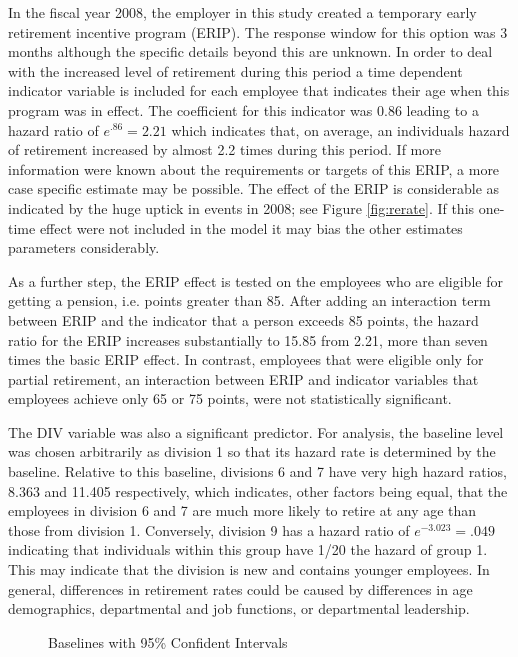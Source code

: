 In the fiscal year 2008, the employer in this study created a temporary early retirement incentive program (ERIP). The response window for this option was 3 months although the specific details beyond this are unknown. In order to deal with the increased level of retirement during this period a time dependent indicator variable is included for each employee that indicates their age when this program was in effect.  The coefficient for this indicator was 0.86 leading to a hazard ratio of $e^{.86} = 2.21$ which indicates that, on average, an individuals hazard of retirement increased by almost 2.2 times during this period.  If more information were known about the requirements or targets of this ERIP, a more case specific estimate may be possible.  The effect of the ERIP is considerable as indicated by the huge uptick in events in 2008; see Figure \ref{fig:rerate}. If this one-time effect were not included in the model it may bias the other estimates parameters considerably.

As a further step, the ERIP effect is tested on the employees who are eligible for getting a pension, i.e. points greater than 85. After adding an interaction term between ERIP and the indicator that a person exceeds 85 points, the hazard ratio for the ERIP increases substantially to 15.85 from 2.21, more than seven times the basic ERIP effect. In contrast, employees that were eligible only for partial retirement, an interaction between ERIP and indicator variables that employees achieve only 65 or 75 points, were not statistically significant.

The DIV variable was also a significant predictor.  For analysis, the baseline level was chosen arbitrarily as division 1 so that its hazard rate is determined by the baseline.  Relative to this baseline, divisions 6 and 7 have very high hazard ratios, 8.363 and 11.405 respectively, which indicates, other factors being equal, that the employees in division 6 and 7 are much more likely to retire at any age than those from division 1.  Conversely, division 9 has a hazard ratio of $e^{-3.023} = .049$ indicating that individuals within this group have 1/20 the hazard of group 1.  This may indicate that the division is new and contains younger employees.  In general, differences in retirement rates could be caused by differences in age demographics, departmental and job functions, or departmental leadership.
\begin{figure}[h!]
	\centering
	\caption{Baselines with 95\% Confident Intervals}
	\label{fig:basepred}
\end{figure}

